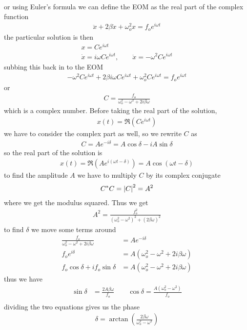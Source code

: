 \documentclass[../main.tex]{subfiles}
\begin{document}
or using Euler's formula we can define the EOM as the real part of the complex function
\begin{align*}
    \ddot x + 2\beta \dot x + \omega_o^2 x = f_o e^{i \omega t}
\end{align*}
the particular solution is then
\begin{align*}
    x = C e^{i \omega t} \\
    \dot x = i \omega C e^{i \omega t}, \qquad \ddot x = -\omega^2 C e^{i \omega t}
\end{align*}
subbing this back in to the EOM
\begin{align*}
    -\omega^2 C e^{i \omega t} + 2 \beta i \omega C e^{i \omega t} + \omega_o^2 C e^{i \omega t} 
    = f_o e^{i \omega t}
\end{align*}
or 
\begin{align*}
    C = \frac{f_o}{\omega_o^2 - \omega^2 + 2 i \beta \omega}
\end{align*}
which is a complex number. Before taking the real part of the solution,
\begin{align*}
    x(t) = \Re(C e^{i \omega t})
\end{align*}
we have to consider the complex part as well, so we rewrite $C$ as
\begin{align*}
    C = A e^{-i\delta} = A \cos \delta - i A \sin \delta
\end{align*}
so the real part of the solution is
\begin{align*}
    x(t) = \Re (A e^{i(\omega t - \delta)}) = A \cos(\omega t - \delta)
\end{align*}
to find the amplitude $A$ we have to multiply $C$ by its complex conjugate
\begin{align*}
    C^* C = \abs{C}^2 = A^2
\end{align*}
where we get the modulus squared. Thus we get
\begin{align*}
    A^2 = \frac{f_o^2}{(\omega_o^2 - \omega^2)^2 + (2\beta \omega)^2}
\end{align*}
to find $\delta$ we move some terms around 
\begin{align*}
    \frac{f_o}{\omega_o^2 - \omega^2 + 2 i \beta \omega} &= A e^{-i \delta} \\
    f_o e^{i\delta} &= A(\omega_o^2 - \omega^2 + 2 i \beta \omega) \\
    f_o \cos \delta + i f_o \sin \delta &= A(\omega_o^2 - \omega^2 + 2 i \beta \omega)
\end{align*}
thus we have
\begin{align*}
    \sin \delta &= \frac{2 A \beta \omega}{f_o} \qquad 
    \cos \delta = \frac{A(\omega_o^2 - \omega^2)}{f_o} \\
\end{align*}
dividing the two equations gives us the phase
\begin{align*}
    \delta = \arctan(\frac{2\beta \omega}{\omega_o^2 - \omega^2})
\end{align*}
\end{document}
